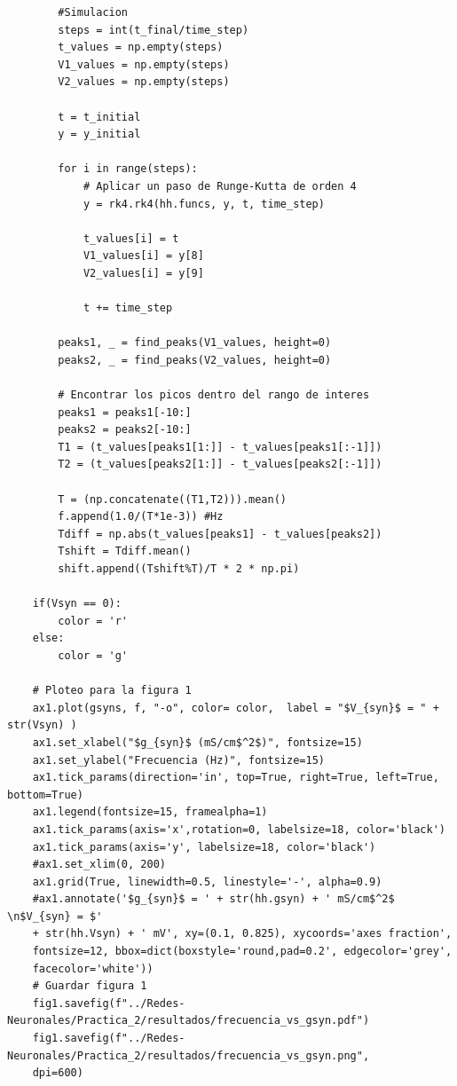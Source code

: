 \documentclass[11pt,twocolumn,twoside]{opticajnl}
\begin{document}
\begin{onecolumn}
\begin{lstlisting}
        #Simulacion
        steps = int(t_final/time_step) 
        t_values = np.empty(steps)
        V1_values = np.empty(steps)
        V2_values = np.empty(steps)

        t = t_initial
        y = y_initial

        for i in range(steps):
            # Aplicar un paso de Runge-Kutta de orden 4
            y = rk4.rk4(hh.funcs, y, t, time_step)

            t_values[i] = t
            V1_values[i] = y[8]
            V2_values[i] = y[9]
            
            t += time_step
                
        peaks1, _ = find_peaks(V1_values, height=0) 
        peaks2, _ = find_peaks(V2_values, height=0) 
        
        # Encontrar los picos dentro del rango de interes
        peaks1 = peaks1[-10:]
        peaks2 = peaks2[-10:]
        T1 = (t_values[peaks1[1:]] - t_values[peaks1[:-1]])
        T2 = (t_values[peaks2[1:]] - t_values[peaks2[:-1]])

        T = (np.concatenate((T1,T2))).mean()
        f.append(1.0/(T*1e-3)) #Hz
        Tdiff = np.abs(t_values[peaks1] - t_values[peaks2])
        Tshift = Tdiff.mean()
        shift.append((Tshift%T)/T * 2 * np.pi) 

    if(Vsyn == 0):
        color = 'r'
    else:
        color = 'g'

    # Ploteo para la figura 1
    ax1.plot(gsyns, f, "-o", color= color,  label = "$V_{syn}$ = " + str(Vsyn) )
    ax1.set_xlabel("$g_{syn}$ (mS/cm$^2$)", fontsize=15)
    ax1.set_ylabel("Frecuencia (Hz)", fontsize=15)
    ax1.tick_params(direction='in', top=True, right=True, left=True, bottom=True)
    ax1.legend(fontsize=15, framealpha=1)
    ax1.tick_params(axis='x',rotation=0, labelsize=18, color='black')
    ax1.tick_params(axis='y', labelsize=18, color='black')
    #ax1.set_xlim(0, 200)
    ax1.grid(True, linewidth=0.5, linestyle='-', alpha=0.9)
    #ax1.annotate('$g_{syn}$ = ' + str(hh.gsyn) + ' mS/cm$^2$ \n$V_{syn} = $' 
    + str(hh.Vsyn) + ' mV', xy=(0.1, 0.825), xycoords='axes fraction', 
    fontsize=12, bbox=dict(boxstyle='round,pad=0.2', edgecolor='grey',
    facecolor='white'))
    # Guardar figura 1
    fig1.savefig(f"../Redes-Neuronales/Practica_2/resultados/frecuencia_vs_gsyn.pdf")
    fig1.savefig(f"../Redes-Neuronales/Practica_2/resultados/frecuencia_vs_gsyn.png",
    dpi=600)


\end{lstlisting}
\end{onecolumn}
\end{document}
